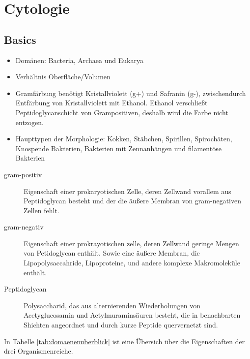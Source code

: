 \section{Cytologie}

\subsection{Basics}

\begin{itemize}
	\item Domänen: Bacteria, Archaea und Eukarya
	\item Verhältnis Oberfläche/Volumen 
	\item Gramfärbung benötigt Kristallviolett (g+) und Safranin (g-),
		zwischendurch Entfärbung von Kristallviolett mit Ethanol.
		Ethanol verschließt Peptidoglycanschicht von Grampositiven,
		deshalb wird die Farbe nicht entzogen.
	\item Haupttypen der Morphologie: 
		Kokken,
		Stäbchen,
		Spirillen,
		Spirochäten,
		Knospende Bakterien,
		Bakterien mit Zennanhängen
		und filamentöse Bakterien
\end{itemize}

\begin{description}
	\item[gram-positiv]
		Eigenschaft einer prokaryotischen Zelle,
		deren Zellwand vorallem aus Peptidoglycan besteht
		und der die äußere Membran von gram-negativen Zellen fehlt.

	\item[gram-negativ] 
		Eigenschaft einer prokrayotischen zelle,
		deren Zellwand geringe Mengen von Petidoglycan enthält.
		Sowie eine äußere Membran,
		die Lipopolysaccahride,
		Lipoproteine,
		und andere komplexe Makromoleküle enthält.

	\item[Peptidoglycan]
		Polysaccharid,
		das aus alternierenden Wiederholungen von Acetyglucosamin und Actylmuraminsäuren besteht,
		die in benachbarten Shichten angeordnet
		und durch kurze Peptide quervernetzt sind.

\end{description}

In Tabelle \ref{tab:domaenenuberblick} ist eine Übersich über die Eigenschaften der drei Organismenreiche.	

